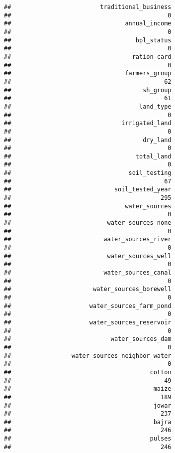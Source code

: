 \documentclass[
]{article}
\begin{document}
\begin{verbatim}
##                         traditional_business 
##                                            0 
##                                annual_income 
##                                            0 
##                                   bpl_status 
##                                            0 
##                                  ration_card 
##                                            0 
##                                farmers_group 
##                                           62 
##                                     sh_group 
##                                           61 
##                                    land_type 
##                                            0 
##                               irrigated_land 
##                                            0 
##                                     dry_land 
##                                            0 
##                                   total_land 
##                                            0 
##                                 soil_testing 
##                                           67 
##                             soil_tested_year 
##                                          295 
##                                water_sources 
##                                            0 
##                           water_sources_none 
##                                            0 
##                          water_sources_river 
##                                            0 
##                           water_sources_well 
##                                            0 
##                          water_sources_canal 
##                                            0 
##                       water_sources_borewell 
##                                            0 
##                      water_sources_farm_pond 
##                                            0 
##                      water_sources_reservoir 
##                                            0 
##                            water_sources_dam 
##                                            0 
##                 water_sources_neighbor_water 
##                                            0 
##                                       cotton 
##                                           49 
##                                        maize 
##                                          189 
##                                        jowar 
##                                          237 
##                                        bajra 
##                                          246 
##                                       pulses 
##                                          246 

\end{verbatim}
\end{document}
